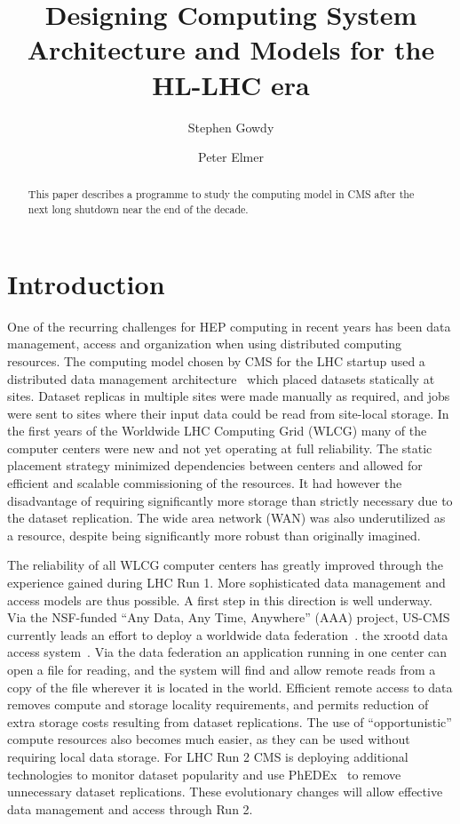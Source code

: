 \documentclass[a4paper]{jpconf}
\begin{document}
\title{Designing Computing System Architecture and Models for the HL-LHC era}

\author{Stephen Gowdy}

\address{Fermilab, Batavia, IL 60510, USA}


\author{Peter Elmer}

\address{Department of Physics, Princeton University, Princeton, NJ
  08540, USA}


\begin{abstract}
This paper describes a programme to study the computing model in CMS after 
the next long shutdown near the end of the decade.
\end{abstract}

\section{Introduction}

One of the recurring challenges for HEP computing in recent years
has been data management, access and organization when using
distributed computing resources.  The computing model chosen by CMS
for the LHC startup used a distributed data management
architecture~\cite{CMSCTDR} which placed datasets statically at
sites. Dataset replicas in multiple sites were made manually as
required, and jobs were sent to sites where their input data could
be read from site-local storage.  In the first years of the Worldwide
LHC Computing Grid (WLCG) many of the computer centers were new and
not yet operating at full reliability. The static placement strategy
minimized dependencies between centers and allowed for efficient
and scalable commissioning of the resources.  It had however the
disadvantage of requiring significantly more storage than strictly
necessary due to the dataset replication. The wide area network
(WAN) was also underutilized as a resource, despite being significantly
more robust than originally imagined.

The reliability of all WLCG computer centers has greatly improved
through the experience gained during LHC Run 1. More sophisticated
data management and access models are thus possible. A first step
in this direction is well underway. Via the NSF-funded ``Any Data,
Any Time, Anywhere'' (AAA) project, US-CMS currently leads an effort
to deploy a worldwide data federation~\cite{AAACHEP13}.  %
the xrootd data access system~\cite{XROOTD1}.  Via the data federation
an application running in one center can open a file for reading,
and the system will find and allow remote reads from a copy of the
file wherever it is located in the world. Efficient remote access
to data removes compute and storage locality requirements, and
permits reduction of extra storage costs resulting from dataset
replications.  The use of ``opportunistic'' compute resources also
becomes much easier, as they can be used without requiring local
data storage.  For LHC Run 2 CMS is deploying additional technologies
to monitor dataset popularity and use PhEDEx~\cite{PHEDEX} to remove
unnecessary dataset replications. These evolutionary changes will
allow effective data management and access through Run 2.
\end{document}
